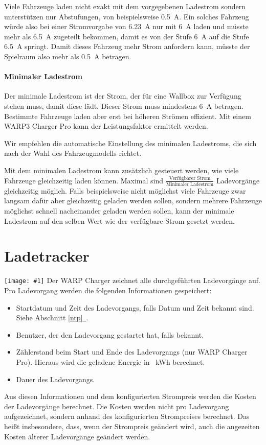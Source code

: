 \documentclass[a4paper,10pt]{article}
\newcommand{\hint}[1]{\begin{tcolorbox}[colback=boxgray,colframe=black,coltext=
white,title=Hinweis,left*=2mm,right*=2mm,boxsep=1mm,bottom=1mm,top=1mm]#1\end{tcolorbox}}
\newcommand{\gfx}[1]{\texttt{[image: \#1]}}
\newcommand*{\fullref}[1]{Abschnitt \hyperref[{#1}]{\ref*{#1}~\nameref*{#1}}}
\begin{document}
\begin{multicols*}{2}
    Viele Fahrzeuge laden nicht exakt mit dem vorgegebenen Ladestrom sondern unterstützen nur Abstufungen, von beispielsweise \SI{0,5}{\ampere}.
    Ein solches Fahrzeug würde also bei einer Stromvorgabe von \SI{6,23}{\ampere} nur mit \SI{6}{\ampere} laden und müsste mehr als \SI{6,5}{\ampere} zugeteilt bekommen, damit es von der Stufe \SI{6}{\ampere} auf die Stufe \SI{6,5}{\ampere} springt.
    Damit dieses Fahrzeug mehr Strom anfordern kann, müsste der Spielraum also mehr als \SI{0,5}{\ampere} betragen.

    \paragraph{Minimaler Ladestrom}
    Der minimale Ladestrom ist der Strom, der für eine Wallbox zur Verfügung stehen muss, damit diese lädt. Dieser Strom muss mindestens \SI{6}{\ampere} betragen.
    Bestimmte Fahrzeuge laden aber erst bei höheren Strömen effizient. Mit einem
	WARP3 Charger Pro kann der Leistungsfaktor ermittelt werden.

    \hint{Wir empfehlen die automatische Einstellung des minimalen Ladestroms, die sich nach der Wahl des Fahrzeugmodells richtet.}

    Mit dem minimalen Ladestrom kann zusätzlich gesteuert werden, wie viele Fahrzeuge gleichzeitig laden können.
    Maximal sind $\frac{\text{Verfügbarer Strom}}{\text{Minimaler Ladestrom}}$ Ladevorgänge gleichzeitig möglich. Falls beispielsweise nicht möglichst viele
    Fahrzeuge zwar langsam dafür aber gleichzeitig geladen werden sollen, sondern mehrere Fahrzeuge möglichst schnell nacheinander geladen werden sollen, kann der minimale Ladestrom auf den selben Wert
    wie der verfügbare Strom gesetzt werden.

    \newpage
    \section{Ladetracker}\label{charge_tracker}
    \gfx{./img_warp2/resized/web_charge_tracker}
    Der WARP Charger zeichnet alle durchgeführten Ladevorgänge auf. Pro Ladevorgang werden die folgenden Informationen gespeichert:
    \begin{itemize}
     \item Startdatum und Zeit des Ladevorgangs, falls Datum und Zeit bekannt
     sind. Siehe \fullref{ntp}.
     \item Benutzer, der den Ladevorgang gestartet hat, falls bekannt.
     \item Zählerstand beim Start und Ende des Ladevorgangs (nur WARP Charger Pro). Hieraus wird die geladene Energie in \SI{}{\kWh} berechnet.
     \item Dauer des Ladevorgangs.
    \end{itemize}
    Aus diesen Informationen und dem konfigurierten Strompreis werden die Kosten der Ladevorgänge berechnet. Die Kosten werden nicht pro Ladevorgang aufgezeichnet, sondern anhand des konfigurierten Strompreises berechnet. Das heißt insbesondere, dass, wenn der Strompreis geändert wird, auch die angezeiten Kosten älterer Ladevorgänge geändert werden.


\end{multicols*}
\end{document}
